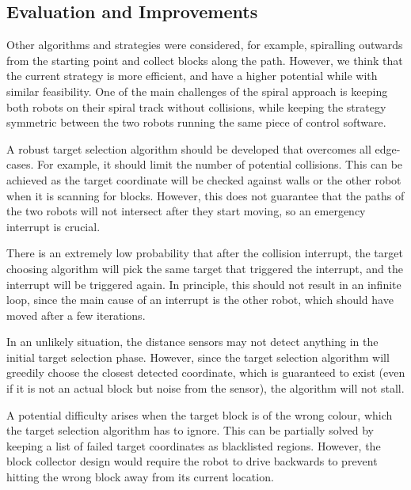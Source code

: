 %     



\subsection{Evaluation and Improvements}


Other algorithms and strategies were considered, for example, spiralling outwards from the starting point and collect blocks along the path. However, we think that the current strategy is more efficient, and have a higher potential while with similar feasibility. One of the main challenges of the spiral approach is keeping both robots on their spiral track without collisions, while keeping the strategy symmetric between the two robots running the same piece of control software.



A robust target selection algorithm should be developed that overcomes all edge-cases. For example, it should limit the number of potential collisions. This can be achieved as the target coordinate will be checked against walls or the other robot when it is scanning for blocks. However, this does not guarantee that the paths of the two robots will not intersect after they start moving, so an emergency interrupt is crucial.

There is an extremely low probability that after the collision interrupt, the target choosing algorithm will pick the same target that triggered the interrupt, and the interrupt will be triggered again. In principle, this should not result in an infinite loop, since the main cause of an interrupt is the other robot, which should have moved after a few iterations.



In an unlikely situation, the distance sensors may not detect anything in the initial target selection phase. However, since the target selection algorithm will greedily choose the closest detected coordinate, which is guaranteed to exist (even if it is not an actual block but noise from the sensor), the algorithm will not stall.





A potential difficulty arises when the target block is of the wrong colour, which the target selection algorithm has to ignore. This can be partially solved by keeping a list of failed target coordinates as blacklisted regions. However, the block collector design would require the robot to drive backwards to prevent hitting the wrong block away from its current location.



